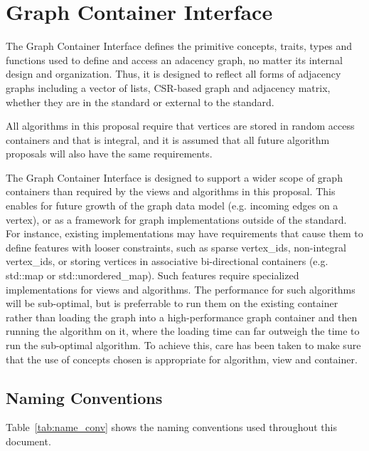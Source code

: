 
\chapter{Graph Container Interface}



The Graph Container Interface defines the primitive concepts, traits, types and functions used to define and access an adacency graph, no matter its internal design and organization. Thus, it is designed to reflect all forms of adjacency graphs including a vector of lists, CSR-based graph and adjacency matrix, whether they are in the standard or external to the standard.

All algorithms in this proposal require that vertices are stored in random access containers and that  is integral, and it is assumed that all future algorithm proposals will also have the same requirements. 

The Graph Container Interface is designed to support a wider scope of graph containers than required by the views and algorithms in this proposal. This enables for future growth of the graph data model (e.g. incoming edges on a vertex), or as a framework for graph implementations outside of the standard. For instance, existing implementations may have requirements that cause them to define features with looser constraints, such as sparse vertex\_ids, non-integral vertex\_ids, or storing vertices in associative bi-directional containers (e.g. std::map or std::unordered\_map). Such features require specialized implementations for views and algorithms. The performance for such algorithms will be sub-optimal, but is preferrable to run them on the existing container rather than loading the graph into a high-performance graph container and then running the algorithm on it, where the loading time can far outweigh the time to run the sub-optimal algorithm. To achieve this, care has been taken to make sure that the use of concepts chosen is appropriate for algorithm, view and container.



\section{Naming Conventions}

Table~\ref{tab:name_conv} shows the naming conventions used throughout this document.

